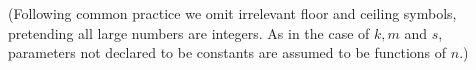 (Following common practice we omit irrelevant
floor and ceiling symbols,
pretending all large numbers are integers.
As in the case of $k,m$ and $s$, parameters not declared
to be constants are assumed to be functions of $n$.)